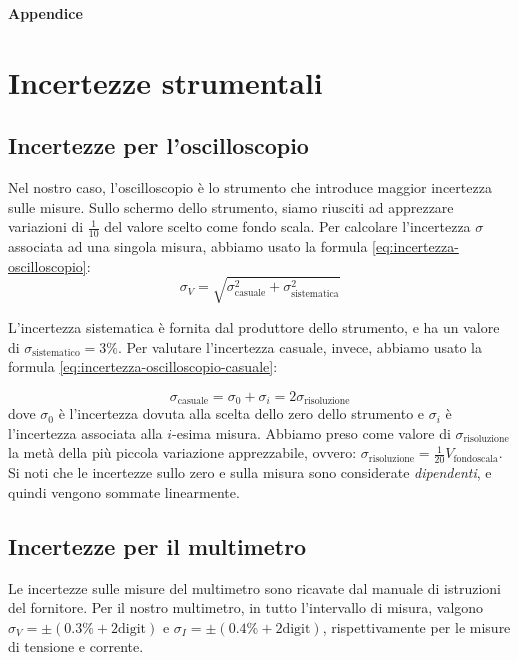 \documentclass[11pt, a4paper, twoside]{article}
\begin{document}
\newpage
\appendix
\textbf{\huge{Appendice}}
\section{Incertezze strumentali}\label{sec:incertezze-strumentali}
  \subsection{Incertezze per l'oscilloscopio}\label{subsec:incertezze-oscilloscopio}
    Nel nostro caso, l'oscilloscopio è lo strumento che introduce maggior incertezza sulle misure. Sullo schermo dello strumento,
    siamo riusciti ad apprezzare variazioni di $\frac 1 {10}$ del valore scelto come fondo scala. Per calcolare l'incertezza $\sigma$ associata
    ad una singola misura, abbiamo usato la formula \eqref{eq:incertezza-oscilloscopio}:
    \begin{equation}
      \sigma_V = \sqrt{
        \sigma_\text{casuale}^2 + \sigma_\text{sistematica}^2
      }
      \label{eq:incertezza-oscilloscopio}
    \end{equation}

    L'incertezza sistematica è fornita dal produttore dello strumento, e ha un valore di $\sigma_\text{sistematico}=3\%$.
    Per valutare l'incertezza casuale, invece, abbiamo usato la formula \eqref{eq:incertezza-oscilloscopio-casuale}:

    \begin{equation}
      \sigma_\text{casuale} = \sigma_0 + \sigma_i = 2\sigma_\text{risoluzione}
      \label{eq:incertezza-oscilloscopio-casuale}
    \end{equation}
    dove $\sigma_0$ è l'incertezza dovuta alla scelta dello zero dello strumento e
    $\sigma_i$ è l'incertezza associata alla $i$-esima misura. Abbiamo preso come valore di $\sigma_\text{risoluzione}$ la metà
    della più piccola variazione apprezzabile, ovvero: $\sigma_\text{risoluzione} = \frac 1 {20} V_\text{fondoscala}$. Si noti che le
    incertezze sullo zero e sulla misura sono considerate \emph{dipendenti}, e quindi vengono sommate linearmente.

  \subsection{Incertezze per il multimetro}\label{subsec:incertezze-multimetro}
    Le incertezze sulle misure del multimetro sono ricavate dal manuale di istruzioni del fornitore. Per il nostro multimetro,
    in tutto l'intervallo di misura, valgono $\sigma_V = \pm (0.3\% + 2\text{digit})$ e $\sigma_I = \pm (0.4\% + 2\text{digit})$, rispettivamente per le misure di tensione e corrente.
\end{document}
